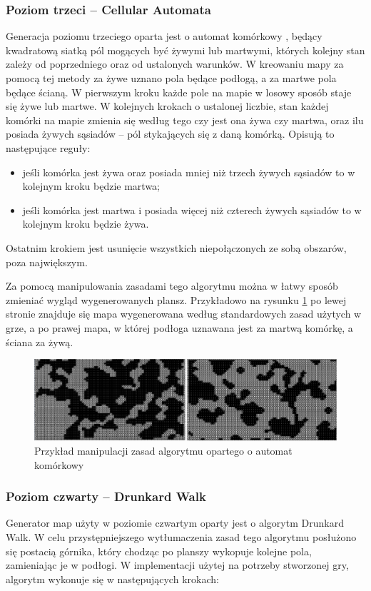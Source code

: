 \documentclass[12pt,twoside]{article}
\begin{document}
\subsubsection{Poziom trzeci -- Cellular Automata}
Generacja poziomu trzeciego oparta jest o automat komórkowy \cite{book_ca}, będący kwadratową siatką pól mogących być żywymi lub martwymi, których kolejny stan zależy od poprzedniego oraz od ustalonych warunków. W kreowaniu mapy za pomocą tej metody za żywe uznano pola będące podłogą, a za martwe pola będące ścianą. W pierwszym kroku każde pole na mapie w losowy sposób staje się żywe lub martwe. W kolejnych krokach o ustalonej liczbie, stan każdej komórki na mapie zmienia się według tego czy jest ona żywa czy martwa, oraz ilu posiada żywych sąsiadów -- pól stykających się z daną komórką. Opisują to następujące reguły:

\begin{itemize}
	\item jeśli komórka jest żywa oraz posiada mniej niż trzech żywych sąsiadów to w kolejnym kroku będzie martwa;
	\item jeśli komórka jest martwa i posiada więcej niż czterech żywych sąsiadów to w kolejnym kroku będzie żywa.
\end{itemize}

Ostatnim krokiem jest usunięcie wszystkich niepołączonych ze sobą obszarów, poza największym.

Za pomocą manipulowania zasadami tego algorytmu można w łatwy sposób zmieniać wygląd wygenerowanych plansz. Przykładowo na rysunku \ref{generators:ca_diff} po lewej stronie znajduje się mapa wygenerowana według standardowych zasad użytych w grze, a po prawej mapa, w której podłoga uznawana jest za martwą komórkę, a ściana za żywą.

\FloatBarrier
\begin{figure}[ht]
	\centering
	\includegraphics[width=16cm]{images/generators/ca_diff.png}
	\caption{Przykład manipulacji zasad algorytmu opartego o automat komórkowy}
	\label{generators:ca_diff}
\end{figure}
\FloatBarrier


\subsubsection{Poziom czwarty -- Drunkard Walk}
Generator map użyty w poziomie czwartym oparty jest o algorytm Drunkard Walk. W celu przystępniejszego wytłumaczenia zasad tego algorytmu posłużono się postacią górnika, który chodząc po planszy wykopuje kolejne pola, zamieniając je w podłogi. W implementacji użytej na potrzeby stworzonej gry, algorytm wykonuje się w następujących krokach:
\end{document}
